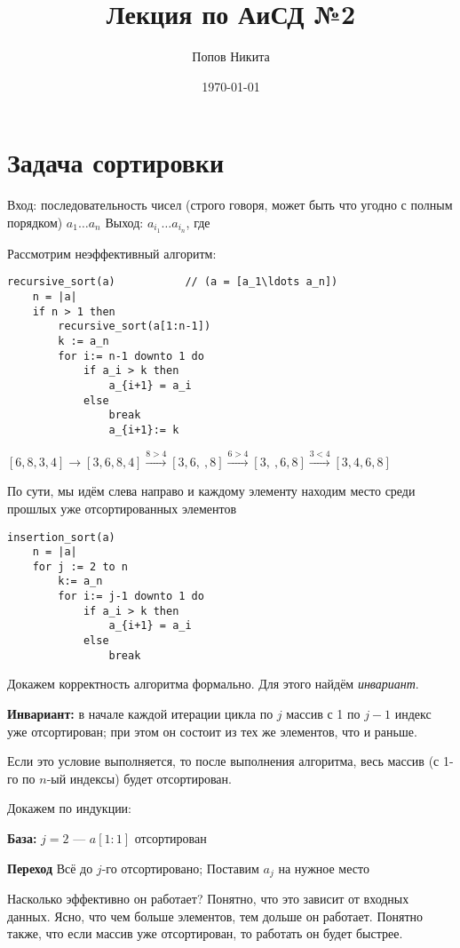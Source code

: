 \documentclass[11pt,a4paper]{article}
\title{Лекция по АиСД №2}
\date{\today}
\author{Попов Никита}
\begin{document}
\maketitle

\section*{Задача сортировки}
Вход: последовательность чисел (строго говоря, может быть что угодно с полным порядком) $a_1 \ldots a_n$
Выход: $a_{i_1} \ldots a_{i_n}$, где 

Рассмотрим неэффективный алгоритм:

\begin{lstlisting}
recursive_sort(a)           // (a = [a_1\ldots a_n])
    n = |a|
    if n > 1 then
        recursive_sort(a[1:n-1])
        k := a_n
        for i:= n-1 downto 1 do
            if a_i > k then
                a_{i+1} = a_i
            else
                break
                a_{i+1}:= k
\end{lstlisting}

$[6,8,3,4] \to [3,6,8,4] \xrightarrow{8>4} [3,6,\ ,8] \xrightarrow{6>4}[3,\ ,6,8] \xrightarrow {3<4}[3,4,6,8]$

По сути, мы идём слева направо и каждому элементу находим место среди прошлых уже отсортированных элементов

\begin{lstlisting}
insertion_sort(a)
    n = |a|
    for j := 2 to n
        k:= a_n
        for i:= j-1 downto 1 do
            if a_i > k then
                a_{i+1} = a_i
            else
                break
\end{lstlisting}

Докажем корректность алгоритма формально. Для этого найдём \emph{инвариант}.

\textbf{Инвариант:} в начале каждой итерации цикла по $j$ массив с 1 по $j-1$ индекс уже отсортирован;
при этом он состоит из тех же элементов, что и раньше.

Если это условие выполняется, то после выполнения алгоритма, весь массив (с 1-го по $n$-ый индексы) будет отсортирован.


Докажем по индукции:

\textbf{База:} $j=2$ --- $a[1:1]$ отсортирован

\textbf{Переход} Всё до $j$-го отсортировано; Поставим $a_j$ на нужное место

Насколько эффективно он работает?  Понятно, что это зависит от входных данных. Ясно, что чем больше элементов, тем дольше он работает.
Понятно также, что если массив уже отсортирован, то работать он будет быстрее.
\end{document}

